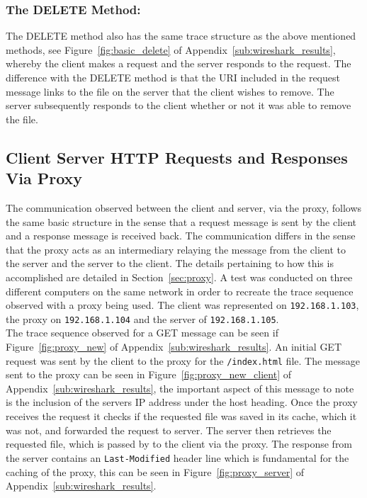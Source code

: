 \documentclass[10pt,twocolumn]{witseiepaper}
\begin{document}
		 \subsubsection*{The DELETE Method:} The DELETE method also has the same trace structure as the above mentioned methods, see Figure~\ref{fig:basic_delete} of Appendix~\ref{sub:wireshark_results}, whereby the client makes a request and the server responds to the request. The difference with the DELETE method is that the URI included in the request message links to the file on the server that the client wishes to remove. The server subsequently responds to the client whether or not it was able to remove the file. 
	 
	 \subsection{Client Server HTTP Requests and Responses Via Proxy}	
	 
		 The communication observed between the client and server, via the proxy, follows the same basic structure in the sense that a request message is sent by the client and a response message is received back. The communication differs in the sense that the proxy acts as an intermediary relaying the message from the client to the server and the server to the client. The details pertaining to how this is accomplished are detailed in Section~\ref{sec:proxy}. A test was conducted on three different computers on the same network in order to recreate the trace sequence observed with a proxy being used. The client was represented on \texttt{192.168.1.103}, the proxy on \texttt{192.168.1.104} and the server of \texttt{192.168.1.105}. \\
		 
		 The trace sequence observed for a GET message can be seen if Figure~\ref{fig:proxy_new} of Appendix~\ref{sub:wireshark_results}. An initial GET request was sent by the client to the proxy for the \texttt{/index.html} file. The message sent to the proxy can be seen in Figure~\ref{fig:proxy_new_client} of Appendix~\ref{sub:wireshark_results}, the important aspect of this message to note is the inclusion of the servers IP address under the host heading. Once the proxy receives the request it checks if the requested file was saved in its cache, which it was not, and forwarded the request to server. The server then retrieves the requested file, which is passed by to the client via the proxy. The response from the server contains an \texttt{Last-Modified} header line which is fundamental for the caching of the proxy, this can be seen in Figure~\ref{fig:proxy_server} of Appendix~\ref{sub:wireshark_results}. \\
		 
\end{document}

